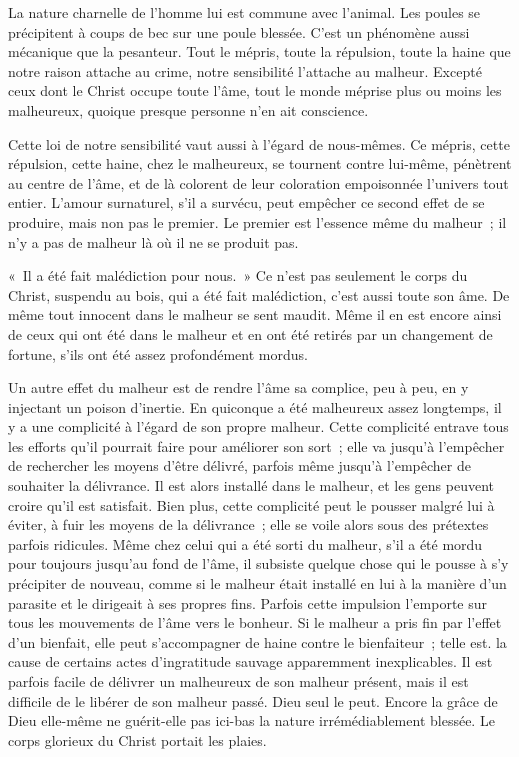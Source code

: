 \documentclass[french,twoside]{book} %
\begin{document}
La nature charnelle de l'homme lui est commune avec l'animal. Les poules se précipitent à coups de bec sur une poule blessée. C'est un phénomène aussi mécanique que la pesanteur. Tout le mépris, toute la répulsion, toute la haine que notre raison attache au crime, notre sensibilité l'attache au malheur. Excepté ceux dont le Christ occupe toute l'âme, tout le monde méprise plus ou moins les malheureux, quoique presque personne n'en ait conscience.\par
Cette loi de notre sensibilité vaut aussi à l'égard de nous-mêmes. Ce mépris, cette répulsion, cette haine, chez le malheureux, se tournent contre lui-même, pénètrent au centre de l'âme, et de là colorent de leur coloration empoisonnée l'univers tout entier. L'amour surnaturel, s'il a survécu, peut empêcher ce second effet de se produire, mais non pas le premier. Le premier est l'essence même du malheur ; il n'y a pas de malheur là où il ne se produit pas.\par
« Il a été fait malédiction pour nous. » Ce n'est pas seulement le corps du Christ, suspendu au bois, qui a été fait malédiction, c'est aussi toute son âme. De même tout innocent dans le malheur se sent maudit. Même il en est encore ainsi de ceux qui ont été dans le malheur et en ont été retirés par un changement de fortune, s'ils ont été assez profondément mordus.\par
Un autre effet du malheur est de rendre l'âme sa complice, peu à peu, en y injectant un poison d'inertie. En quiconque a été malheureux assez longtemps, il y a une complicité à l'égard de son propre malheur. Cette complicité entrave tous les efforts qu'il pourrait faire pour améliorer son sort ; elle va jusqu'à l'empêcher de rechercher les moyens d'être délivré, parfois même jusqu'à l'empêcher de souhaiter la délivrance. Il est alors installé dans le malheur, et les gens peuvent croire qu'il est satisfait. Bien plus, cette complicité peut le pousser malgré lui à éviter, à fuir les moyens de la délivrance ; elle se voile alors sous des prétextes parfois ridicules. Même chez celui qui a été sorti du malheur, s'il a été mordu pour toujours jusqu'au fond de l'âme, il subsiste quelque chose qui le pousse à s'y précipiter de nouveau, comme si le malheur était installé en lui à la manière d'un parasite et le dirigeait à ses propres fins. Parfois cette impulsion l'emporte sur tous les mouvements de l'âme vers le bonheur. Si le malheur a pris fin par l'effet d'un bienfait, elle peut s'accompagner de haine contre le bienfaiteur ; telle est. la cause de certains actes d'ingratitude sauvage apparemment inexplicables. Il est parfois facile de délivrer un malheureux de son malheur présent, mais il est difficile de le libérer de son malheur passé. Dieu seul le peut. Encore la grâce de Dieu elle-même ne guérit-elle pas ici-bas la nature irrémédiablement blessée. Le corps glorieux du Christ portait les plaies.\par
\end{document}
